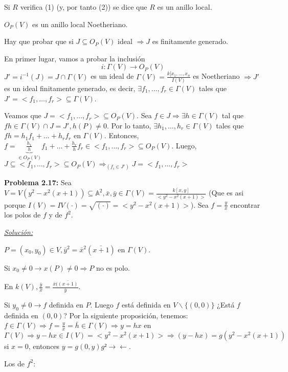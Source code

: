 Si $R$ verifica (1) (y, por tanto (2)) se dice que $R$ es un anillo local. 

\begin{Prop}
$O_P(V)$ es un anillo local Noetheriano.
\end{Prop}

\begin{Dem}
Hay que probar que si $J\subseteq O_P(V)$ ideal $\Rightarrow J$ es finitamente generado. 

En primer lugar, vamos a probar la inclusión 
$$i:\Gamma(V)\rightarrow O_P(V)$$
$J'=i^{-1}(J)=J\cap \Gamma(V)$ es un ideal de $\Gamma(V)=\frac{k[x_1,\dots,x_n}{I(V)}$ es Noetheriano $\Rightarrow J'$ es un ideal finitamente generado, es decir, $\exists f_1,\dots,f_r \in \Gamma(V)$ tales que $J'=<f_1,\dots,f_r>\subseteq \Gamma(V)$. 

Veamos que $J=<f_1,\dots,f_r>\subseteq O_P(V)$. Sea $f\in J \Rightarrow \exists h \in  \Gamma(V)$ tal que $fh\in \Gamma(V)\cap J=J',h(P)\neq 0$. Por lo tanto, $\exists h_1,\dots,h_r\in \Gamma(V)$ tales que $fh=h_1f_1+\dots+h_rf_r$ en $\Gamma(V)$. Entonces, $f=\underbrace{\frac{h_1}{h}}_{\in O_P (V)}f_1+\dots+\frac{h_r}{h}f_r \in <f_1,\dots,f_r>\subseteq O_P(V)$. Luego, $J\subseteq <f_1,\dots,f_r>\subseteq O_P(V)\Rightarrow_{(f_i\in J')} J=<f_1,\dots,f_r>$
\end{Dem}


\textbf{Problema 2.17: } Sea $V=V(y^2-x^2(x+1))\subseteq \mathbb{A}^2, \bar{x},\bar{y}\in \Gamma(V)=\frac{k[x,y]}{<y^2-x^2(x+1)>}$ (Que es asi porque $I(V)=IV(\cdot)=\sqrt{(\cdot)}=<y^2-x^2(x+1)>$). Sea $f=\frac{y}{x}$ encontrar los polos de $f$ y de $f^2$.

\underline{\textit{Solución: }}

$P=(x_0,y_0)\in V, \bar{y}^2=\bar{x}^2(\bar{x+1})$ en $\Gamma(V)$.

Si $x_0\neq 0 \rightarrow x(P)\neq 0 \Rightarrow P$ no es polo.

En $k(V), \frac{\bar{y}}{\bar{x}}=\frac{\bar{x}(\bar{(x+1)}}{\bar{y}}.$

Si $y_0\neq 0 \rightarrow f$ definida en $P$. Luego $f$ está definida en $V\backslash \{(0,0)\}$ ¿Está $f$ definida en $(0,0)$?
Por la siguiente proposición, tenemos: $f\in \Gamma(V) \Rightarrow f=\frac{y}{x}= \bar{h} \in \Gamma(V) \Rightarrow y=hx$ en $\Gamma(V) \Rightarrow y-hx\in I(V)=<y^2-x^2(x+1)> \Rightarrow (y-hx)=g(y^2-x^2(x+1)) $ si $x=0$, entonces $y=g(0,y)g² \rightarrow \leftarrow $.

Los de $f^2$: 


